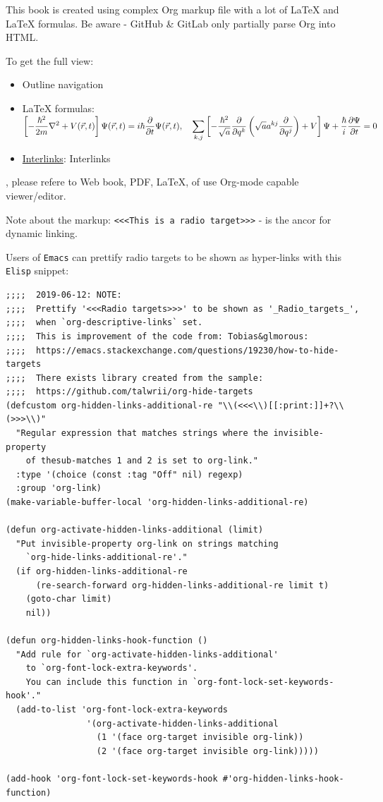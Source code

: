 \documentclass[a4paper,14pt,oneside]{book}
\begin{document}
This book is created using complex Org markup file with a lot of \LaTeX{} and \LaTeX{} formulas.
Be aware - GitHub \& GitLab only partially parse Org into HTML.

To get the full view:
\begin{itemize}
\item Outline navigation
\item \LaTeX{} formulas:
\({\displaystyle\left[{-\frac{\hbar^{2}}{2m}}\nabla^{2}+V(\vec{r},t)\right]\Psi({\vec{r}},t)=i\hbar{\partial\over\partial{t}}\Psi({\vec{r}},t),\quad\sum_{k,j}\left[-{\frac{\hbar^{2}}{\sqrt{a}}}{\frac{\partial}{\partial{q^{k}}}}\left({\sqrt{a}}a^{kj}{\frac{\partial}{\partial{q^{j}}}}\right)+V\right]\Psi+{\frac{\hbar}{i}}{\frac{\partial{\Psi}}{\partial{t}}}=0}\)
\item \hyperref[orga8a7632]{Interlinks}: \label{orga8a7632}Interlinks
\end{itemize}

, please refere to Web book, PDF, \LaTeX{}, of use Org-mode capable viewer/editor.

Note about the markup: \texttt{<<<This is a radio target>>>} - is the ancor for dynamic linking.

Users of \texttt{Emacs} can prettify radio targets to be shown as hyper-links with this \texttt{Elisp} snippet:

\begin{verbatim}
;;;;  2019-06-12: NOTE:
;;;;  Prettify '<<<Radio targets>>>' to be shown as '_Radio_targets_',
;;;;  when `org-descriptive-links` set.
;;;;  This is improvement of the code from: Tobias&glmorous:
;;;;  https://emacs.stackexchange.com/questions/19230/how-to-hide-targets
;;;;  There exists library created from the sample:
;;;;  https://github.com/talwrii/org-hide-targets
(defcustom org-hidden-links-additional-re "\\(<<<\\)[[:print:]]+?\\(>>>\\)"
  "Regular expression that matches strings where the invisible-property
    of thesub-matches 1 and 2 is set to org-link."
  :type '(choice (const :tag "Off" nil) regexp)
  :group 'org-link)
(make-variable-buffer-local 'org-hidden-links-additional-re)

(defun org-activate-hidden-links-additional (limit)
  "Put invisible-property org-link on strings matching
    `org-hide-links-additional-re'."
  (if org-hidden-links-additional-re
      (re-search-forward org-hidden-links-additional-re limit t)
    (goto-char limit)
    nil))

(defun org-hidden-links-hook-function ()
  "Add rule for `org-activate-hidden-links-additional'
    to `org-font-lock-extra-keywords'.
    You can include this function in `org-font-lock-set-keywords-hook'."
  (add-to-list 'org-font-lock-extra-keywords
                '(org-activate-hidden-links-additional
                  (1 '(face org-target invisible org-link))
                  (2 '(face org-target invisible org-link)))))

(add-hook 'org-font-lock-set-keywords-hook #'org-hidden-links-hook-function)
\end{verbatim}
\end{document}

